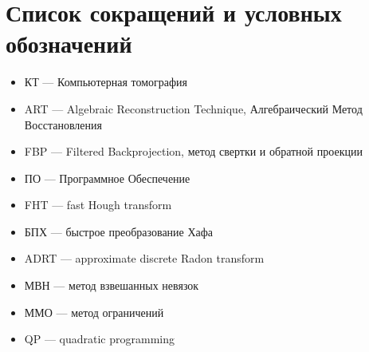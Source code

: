 \chapter*{Список сокращений и условных обозначений}
\begin{itemize}
\item КТ --- Компьютерная томография
\item ART --- Algebraic Reconstruction Technique, Алгебраический Метод Восстановления
\item FBP --- Filtered Backprojection, метод свертки и обратной проекции
\item ПО --- Программное Обеспечение
\item FHT --- fast Hough transform
\item БПХ --- быстрое преобразование Хафа
\item ADRT --- approximate discrete Radon transform
\item МВН --- метод взвешанных невязок
\item ММО --- метод ограничений
\item QP --- quadratic programming
\end{itemize}


